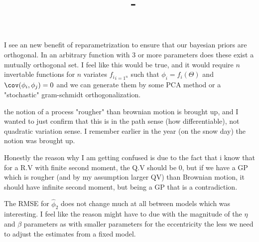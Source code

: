 \documentclass[answers,12pt,addpoints]{exam}
\author{\name}
\title{\course \ - \assignment}
\begin{document}
\maketitle

\newpage
\begin{questions}
\question I see an new benefit of reparametrization to ensure that our bayesian priors are orthogonal. In an arbitrary function with 3 or more parameters does these exist a mutually orthogonal set. I feel like this would be true, and it would require $n$ invertable functions for $n$ variates ${f_i}_{i=1^n}$ such that $\phi_i = f_i(\Theta)$ and $\cov(\phi_i, \phi_j) = 0$ and we can generate them by some PCA method or a "stochastic" gram-schmidt orthogonalization. 

\question the notion of a process "rougher" than brownian motion is brought up, and I wanted to just confirm that this is in the path sense (how differentiable), not quadratic variation sense. I remember earlier in the year (on the snow day) the notion was brought up. 

Honestly the reason why I am getting confused is due to the fact that i know that for a R.V with finite second moment, the Q.V should be 0, but if we have a GP which is rougher (and by my assumption larger QV) than Brownian motion, it should have infinite second moment, but being a GP that is a contradiction.

\question The RMSE for $\hat \phi_2$ does not change much at all between models which was interesting. I feel like the reason might have to due with the magnitude of the $\eta$ and $\beta$ parameters as with smaller parameters for the eccentricity the less we need to adjust the estimates from a fixed model.




\end{questions}
\end{document}
